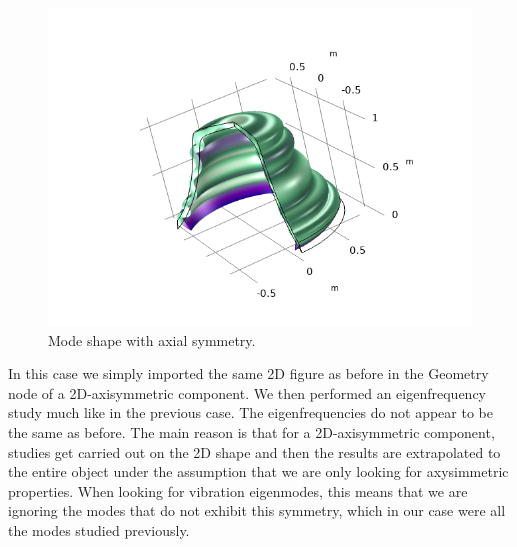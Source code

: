 \documentclass[a4paper]{article}
\begin{document}
\begin{figure}[h!]
	\centering\includegraphics[width=0.75\linewidth]{axisMode.png}
	\caption{Mode shape with axial symmetry.}
	\label{fig:ax}
\end{figure}

In this case we simply imported the same 2D figure as before in the Geometry node of a 2D-axisymmetric component. We then performed an eigenfrequency study much like in the previous case. The eigenfrequencies do not appear to be the same as before. The main reason is that for a 2D-axisymmetric component, studies get carried out on the 2D shape and then the results are extrapolated to the entire object under the assumption that we are only looking for axysimmetric properties. When looking for vibration eigenmodes, this means that we are ignoring the modes that do not exhibit this symmetry, which in our case were all the modes studied previously.
\end{document}
